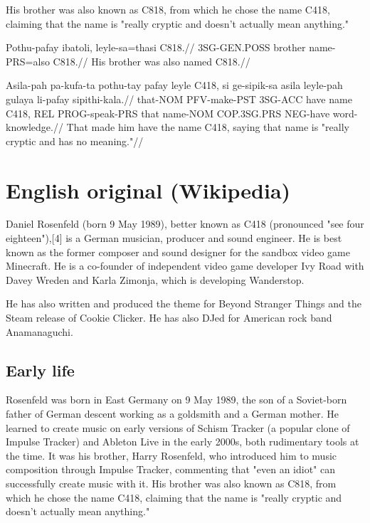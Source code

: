 His brother was also known as C818, from which he chose the name C418, claiming that the name is "really cryptic and doesn't actually mean anything."

\ex
\begingl
\gla  Pothu-pafay  ibatoli, leyle-sa=thasi C818.//
\glb  3SG-GEN.POSS brother  name-PRS=also  C818.//
\glft His brother was also named C818.//
\endgl
\xe

\ex
\begingl
\gla  Asila-pah pa-kufa-ta   pothu-tay pafay leyle C418, si  ge-sipik-sa    asila leyle-pah gulaya      li-pafay sipithi-kala.//
\glb  that-NOM  PFV-make-PST 3SG-ACC   have  name  C418, REL PROG-speak-PRS that  name-NOM  COP.3SG.PRS NEG-have word-knowledge.//
\glft That made him have the name C418, saying that name is "really cryptic and has no meaning."//
\endgl
\xe

\section{English original (Wikipedia)}
Daniel Rosenfeld (born 9 May 1989), better known as C418 (pronounced "see four eighteen"),[4] is a German musician, producer and sound engineer.
He is best known as the former composer and sound designer for the sandbox video game Minecraft.
He is a co-founder of independent video game developer Ivy Road with Davey Wreden and Karla Zimonja, which is developing Wanderstop. 

He has also written and produced the theme for Beyond Stranger Things and the Steam release of Cookie Clicker.
He has also DJed for American rock band Anamanaguchi. 

\subsection{Early life}
Rosenfeld was born in East Germany on 9 May 1989, the son of a Soviet-born father of German descent working as a goldsmith and a German mother.
He learned to create music on early versions of Schism Tracker (a popular clone of Impulse Tracker) and Ableton Live in the early 2000s, both rudimentary tools at the time.
It was his brother, Harry Rosenfeld, who introduced him to music composition through Impulse Tracker, commenting that "even an idiot" can successfully create music with it.
His brother was also known as C818, from which he chose the name C418, claiming that the name is "really cryptic and doesn't actually mean anything."

